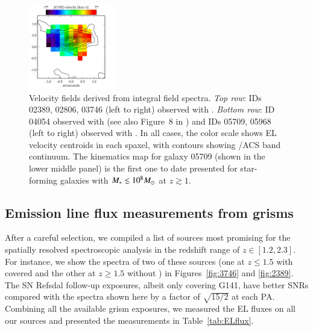 \begin{figure}
    \includegraphics[width=0.33\textwidth]{fig_kinematics/v_593.pdf}
    \caption[Velocity fields derived from integral field spectra.]{Velocity fields derived from integral field spectra. \textit{Top row}: IDs
    02389, 02806, 03746 (left to right) observed with \muse. \textit{Bottom row}: ID 04054
    observed with \muse (see also Figure~8 in \citet{2016ApJ...822...78G}) and IDs 05709,
    05968 (left to right) observed with \kmos.  In all cases, the color scale shows EL
    velocity centroids in each spaxel, with contours showing \hst/ACS \I band continuum.
    The kinematics map for galaxy 05709 (shown in the lower middle panel) is the first one to
    date presented for star-forming galaxies with $M_\ast\lesssim10^8M_\odot$ at $z\gtrsim1$.}
    \label{fig:kinem}
\end{figure}


\renewcommand{\thesubsection}{\thechapter.A.\arabic{subsection}}
\subsection{Emission line flux measurements from \protect\hst grisms}\label{sect:ELflux}



After a careful selection, we compiled a list of sources most promising for the spatially resolved spectroscopic analysis in the 
redshift range of $z\in[1.2, 2.3]$.
For instance, we show the \glass spectra of two of these sources (one at $z\leq1.5$ with \Ha covered and the other at $z\geq1.5$ 
without \Ha) in Figures~\ref{fig:3746} and \ref{fig:2389}.
The SN Refsdal follow-up exposures, albeit only covering G141, have better SNRs compared with the spectra shown here by a factor 
of $\sqrt{15/2}$ at each PA.  Combining all the available grism exposures, we measured the EL fluxes on all our sources and 
presented the measurements in Table~\ref{tab:ELflux}.

